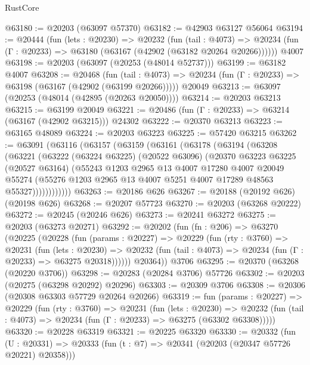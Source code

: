 \begin{lexlean}{RustCore}
\begin{coremodule}
@63180 := @20203 (@63097 @57370)
@63182 := @42903 @63127 @56064
@63194 := @20444
    (fun (lets : @20230) =>
    @20232
      (fun (tail : @4073) =>
      @20234 (fun (Γ : @20233) => @63180 (@63167 (@42902 (@63182 @20264 @20266))))))
    @4007
@63198 := @20203 (@63097 (@20253 (@48014 @52737)))
@63199 := @63182 @4007
@63208 := @20468
    (fun (tail : @4073) => @20234 (fun (Γ : @20233) => @63198 (@63167 (@42902 (@63199 @20266)))))
    @20049
@63213 := @63097 (@20253 (@48014 (@42895 (@20263 @20050))))
@63214 := @20203 @63213
@63215 := @63199 @20049
@63221 := @20486 (fun (Γ : @20233) => @63214 (@63167 (@42902 @63215))) @24302
@63222 := @20370 @63213
@63223 := @63165 @48089
@63224 := @20203 @63223
@63225 := @57420 @63215
@63262 := @63091
    (@63116
      (@63157
        (@63159
          (@63161
            (@63178
              (@63194
                (@63208
                  (@63221
                    (@63222
                      (@63224 @63225)
                      (@20522 @63096)
                      (@20370
                        @63223
                        @63225
                        (@20527 @63164)
                        (@55243
                          @1203
                          @2965
                          @13
                          @4007
                          @17280
                          @4007
                          @20049
                          @55274
                          (@55276 @1203 @2965 @13 @4007 @5251 @4007 @17289 @48563 @55327))))))))))))
@63263 := @20186 @626
@63267 := @20188 (@20192 @626) (@20198 @626)
@63268 := @20207 @57723
@63270 := @20203 (@63268 @20222)
@63272 := @20245 (@20246 @626)
@63273 := @20241 @63272
@63275 := @20203 (@63273 @20271)
@63292 := @20202
    (fun (fn : @206) =>
    @63270
      (@20225
        (@20228
          (fun (params : @20227) =>
          @20229
            (fun (rty : @3760) =>
            @20231
              (fun (lets : @20230) =>
              @20232 (fun (tail : @4073) => @20234 (fun (Γ : @20233) => @63275 @20318))))))
        @20364))
    @3706
@63295 := @20370 (@63268 (@20220 @3706))
@63298 := @20283 (@20284 @3706) @57726
@63302 := @20203 (@20275 (@63298 @20292) @20296)
@63303 := @20309 @3706
@63308 := @20306 (@20308 @63303 @57729 @20264 @20266)
@63319 := fun (params : @20227) =>
  @20229
    (fun (rty : @3760) =>
    @20231
      (fun (lets : @20230) =>
      @20232 (fun (tail : @4073) => @20234 (fun (Γ : @20233) => @63275 (@63302 @63308)))))
@63320 := @20228 @63319
@63321 := @20225 @63320
@63330 := @20332
    (fun (U : @20331) => @20333 (fun (t : @7) => @20341 (@20203 (@20347 @57726 @20221) @20358)))

\end{coremodule}
\end{lexlean}
